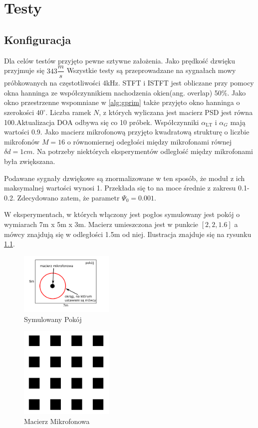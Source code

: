 \chapter{Testy}
\label{chapter-5}
\section{Konfiguracja}
Dla celów testów przyjęto pewne sztywne założenia. Jako prędkość dzwięku przyjmuje się $343 \dfrac{m}{s}$ Wszystkie testy są przeprowadzane na sygnałach mowy próbkowanych na częstotliwości 4kHz. STFT i ISTFT jest obliczane przy pomocy okna hanninga \cite{hann} ze współczynnikiem nachodzenia okien(ang. overlap) 50$\%$. Jako okno przestrzenne wspomniane w \ref{alg:gprim} także przyjęto okno hanninga o szerokości $40^{\circ}$. Liczba ramek $N$, z których wyliczana jest macierz PSD jest równa 100.Aktualizacja DOA odbywa się co 10 próbek. Współczynniki $\alpha_{\mathrm{LT}}$ i $\alpha_{G}$ mają wartości 0.9. Jako macierz mikrofonową przyjęto kwadratową strukturę o liczbie mikrofonów $M=16$ o równomiernej odegłości między mikrofonami równej $\delta d = 1cm$. Na potrzeby niektórych eksperymentów odległość między mikrofonami była zwiększana.

\noindent Podawane sygnały dzwiękowe są znormalizowane w ten sposób, że moduł z ich maksymalnej wartości wynosi 1. Przekłada się to na moce średnie z zakresu 0.1-0.2. Zdecydowano zatem, że parametr $\Psi_{0} = 0.001$. 

W eksperymentach, w których włączony jest pogłos symulowany jest pokój o wymiarach 7m x 5m x 3m. Macierz umieszczona jest w punkcie $[2,2,1.6]$ a mówcy znajdują się w odległości 1.5m od niej. Ilustracja znajduje się na rysunku \ref{fig:room}.

\begin{figure}[h!]
    \centering
    \includegraphics[width=0.4\textwidth]{Images/room.png}
    \caption{Symulowany Pokój}
    \label{fig:room}
\end{figure}

\begin{figure}[h!]
    \centering
    \includegraphics[width=0.4\textwidth]{Images/microphone.png}
    \caption{Macierz Mikrofonowa}
    \label{fig:microphone}
\end{figure}

